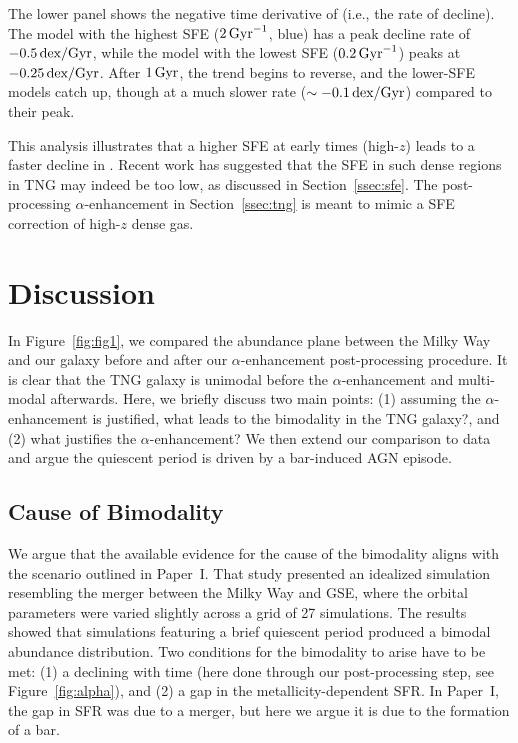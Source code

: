 The lower panel shows the negative time derivative of \MgFe{} (i.e., the rate of decline). The model with the highest SFE ($2\,\textrm{Gyr}^{-1}$, blue) has a peak decline rate of $-0.5\,\textrm{dex}/\textrm{Gyr}$, while the model with the lowest SFE ($0.2\,\textrm{Gyr}^{-1}$) peaks at $-0.25\,\textrm{dex}/\textrm{Gyr}$. After $1\,\textrm{Gyr}$, the trend begins to reverse, and the lower-SFE models catch up, though at a much slower rate ($\sim-0.1\,\textrm{dex}/\textrm{Gyr}$) compared to their peak.

This analysis illustrates that a higher SFE at early times (high-$z$) leads to a faster decline in \MgFe{}. Recent work has suggested that the SFE in such dense regions in TNG may indeed be too low, as discussed in Section~\ref{ssec:sfe}. The post-processing $\alpha$-enhancement in Section~\ref{ssec:tng} is meant to mimic a SFE correction of high-$z$ dense gas.

\section{Discussion}\label{sec:disc}
In Figure~\ref{fig:fig1}, we compared the abundance plane between the Milky Way and our galaxy before and after our $\alpha$-enhancement post-processing procedure. It is clear that the TNG galaxy is unimodal before the $\alpha$-enhancement and multi-modal afterwards. Here, we briefly discuss two main points: (1) assuming the $\alpha$-enhancement is justified, what leads to the bimodality in the TNG galaxy?, and (2) what justifies the $\alpha$-enhancement? We then extend our comparison to data and argue the quiescent period is driven by a bar-induced AGN episode.

\subsection{Cause of Bimodality}\label{ssec:bim_cause}
We argue that the available evidence for the cause of the bimodality aligns with the scenario outlined in Paper~I. That study presented an idealized simulation resembling the merger between the Milky Way and GSE, where the orbital parameters were varied slightly across a grid of 27 simulations. The results showed that simulations featuring a brief quiescent period produced a bimodal abundance distribution. Two conditions for the bimodality to arise have to be met: (1) a declining \alphaFe{} with time (here done through our post-processing step, see Figure~\ref{fig:alpha}), and (2) a gap in the metallicity-dependent SFR. In Paper~I, the gap in SFR was due to a merger, but here we argue it is due to the formation of a bar.

